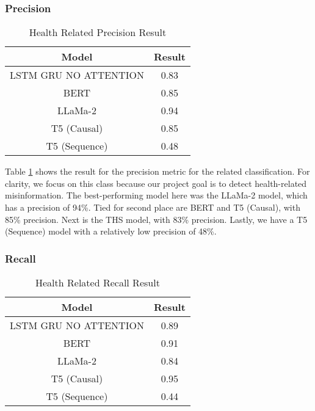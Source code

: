 \subsubsection{Precision}
\begin{table}[H]
	\centering
	\caption{Health Related Precision Result}
	\begin{tabular}{||c | c||} 
		\hline
		\textbf{Model} & \textbf{Result} \\ [0.5ex] 
		\hline
		LSTM GRU NO ATTENTION & 0.83  \\
		\hline		
		BERT & 0.85  \\
		\hline
		LLaMa-2 & 0.94 \\ 
		\hline
		T5 (Causal) & 0.85 \\
		\hline
		T5 (Sequence) & 0.48 \\
		\hline
	\end{tabular}
	\label{table:HealthPrecision}
\end{table}

Table \ref{table:HealthPrecision} shows the result for the precision metric for the related classification. For clarity, we focus on this class because our project
goal is to detect health-related misinformation. The best-performing model here was the LLaMa-2 model, which has a precision of 94\%. Tied for second place
are BERT and T5 (Causal), with 85\% precision. Next is the THS model, with 83\% precision. Lastly, we have a T5 (Sequence) model with a relatively low
precision of 48\%.

\subsubsection{Recall}
\begin{table}[H]
	\centering
	\caption{Health Related Recall Result}
	\begin{tabular}{||c | c||} 
		\hline
		\textbf{Model} & \textbf{Result} \\ [0.5ex] 
		\hline
		LSTM GRU NO ATTENTION & 0.89  \\
		\hline
		BERT & 0.91  \\
		\hline
		LLaMa-2 & 0.84 \\ 
		\hline
		T5 (Causal) & 0.95 \\
		\hline
		T5 (Sequence) & 0.44 \\
		\hline
	\end{tabular}
	\label{table:HealthRecall}
\end{table}

